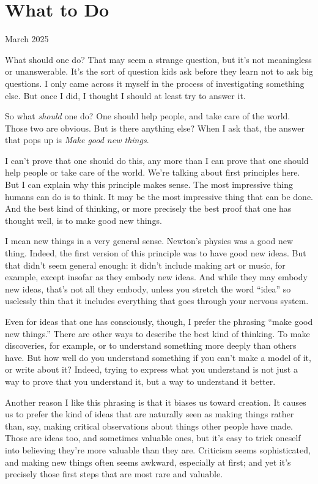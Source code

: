 \chapter{What to Do}

March 2025

What should one do? That may seem a strange question, but it's not
meaningless or unanswerable. It's the sort of question kids ask before
they learn not to ask big questions. I only came across it myself in the
process of investigating something else. But once I did, I thought I
should at least try to answer it.

So what \emph{should} one do? One should help people, and take care of
the world. Those two are obvious. But is there anything else? When I ask
that, the answer that pops up is \emph{Make good new things}.

I can't prove that one should do this, any more than I can prove that
one should help people or take care of the world. We're talking about
first principles here. But I can explain why this principle makes sense.
The most impressive thing humans can do is to think. It may be the most
impressive thing that can be done. And the best kind of thinking, or
more precisely the best proof that one has thought well, is to make good
new things.

I mean new things in a very general sense. Newton's physics was a good
new thing. Indeed, the first version of this principle was to have good
new ideas. But that didn't seem general enough: it didn't include making
art or music, for example, except insofar as they embody new ideas. And
while they may embody new ideas, that's not all they embody, unless you
stretch the word ``idea'' so uselessly thin that it includes everything
that goes through your nervous system.

Even for ideas that one has consciously, though, I prefer the phrasing
``make good new things.'' There are other ways to describe the best kind
of thinking. To make discoveries, for example, or to understand
something more deeply than others have. But how well do you understand
something if you can't make a model of it, or write about it? Indeed,
trying to express what you understand is not just a way to prove that
you understand it, but a way to understand it better.

Another reason I like this phrasing is that it biases us toward
creation. It causes us to prefer the kind of ideas that are naturally
seen as making things rather than, say, making critical observations
about things other people have made. Those are ideas too, and sometimes
valuable ones, but it's easy to trick oneself into believing they're
more valuable than they are. Criticism seems sophisticated, and making
new things often seems awkward, especially at first; and yet it's
precisely those first steps that are most rare and valuable.

